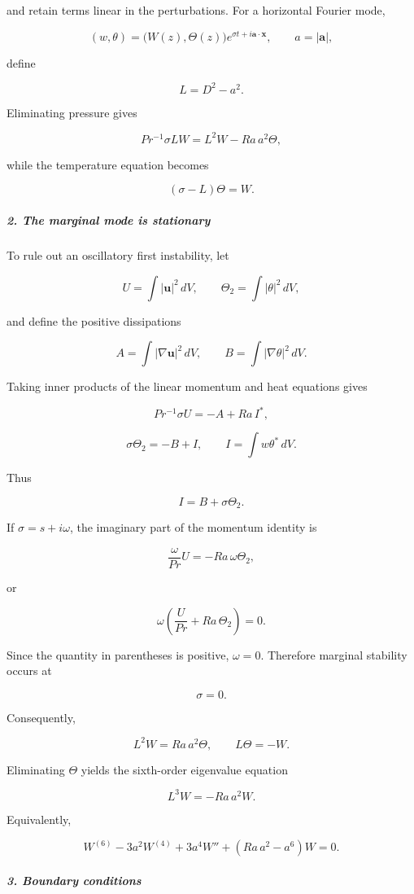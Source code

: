 and retain terms linear in the perturbations. For a horizontal Fourier mode,

\[
(w,\theta) = \bigl(W(z),\Theta(z)\bigr) e^{\sigma t+i\mathbf a\cdot\mathbf x}, \qquad a=|\mathbf a|,
\]

define

\[
L=D^2-a^2.
\]

Eliminating pressure gives

\[
Pr^{-1}\sigma LW=L^2W-Ra\,a^2\Theta,
\]

while the temperature equation becomes

\[
(\sigma-L)\Theta=W.
\]

\subparagraph*{2. The marginal mode is stationary}

To rule out an oscillatory first instability, let

\[
U=\int|\mathbf u|^2\,dV,\qquad \Theta_2=\int|\theta|^2\,dV,
\]

and define the positive dissipations

\[
A=\int|\nabla\mathbf u|^2\,dV,\qquad B=\int|\nabla\theta|^2\,dV.
\]

Taking inner products of the linear momentum and heat equations gives

\[
Pr^{-1}\sigma U=-A+Ra\,I^\ast,
\]

\[
\sigma\Theta_2=-B+I, \qquad I=\int w\theta^\ast\,dV.
\]

Thus

\[
I=B+\sigma\Theta_2.
\]

If $\sigma=s+i\omega$, the imaginary part of the momentum identity is

\[
\frac{\omega}{Pr}U=-Ra\,\omega\Theta_2,
\]

or

\[
\omega\left(\frac{U}{Pr}+Ra\,\Theta_2\right)=0.
\]

Since the quantity in parentheses is positive, $\omega=0$. Therefore marginal stability occurs at

\[
\sigma=0.
\]

Consequently,

\[
L^2W=Ra\,a^2\Theta,\qquad L\Theta=-W.
\]

Eliminating $\Theta$ yields the sixth-order eigenvalue equation

\[
{L^3W=-Ra\,a^2W}.
\]

Equivalently,

\[
W^{(6)}-3a^2W^{(4)}+3a^4W'' +\left(Ra\,a^2-a^6\right)W=0.
\]

\subparagraph*{3. Boundary conditions}

